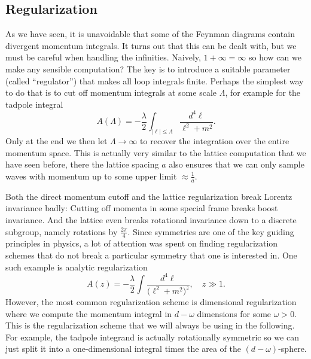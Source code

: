 \documentclass[12pt]{article}
\begin{document}
\subsection{Regularization}

As we have seen, it is unavoidable that some of the Feynman diagrams
contain divergent momentum integrals. It turns out that this can be
dealt with, but we must be careful when handling the
infinities. Naively, $1+\infty = \infty$ so how can we make any
sensible computation? The key is to introduce a suitable parameter
(called ``regulator'') that makes all loop integrals finite. Perhaps
the simplest way to do that is to cut off momentum integrals at some
scale $\Lambda$, for example for the tadpole integral
\begin{equation}
  A(\Lambda) = - \frac{\lambda}{2} \int_{|\ell| \leq \Lambda}
  \frac{d^4 \ell}{\ell^2+m^2}.
\end{equation}
Only at the end we then let $\Lambda \to \infty$ to recover the
integration over the entire momentum space. This is actually very
similar to the lattice computation that we have seen before, there the
lattice spacing $a$ also ensures that we can only sample waves with
momentum up to some upper limit $\approx \frac{1}{a}$.

Both the direct momentum cutoff and the lattice regularization break
Lorentz invariance badly: Cutting off momenta in some special frame
breaks boost invariance. And the lattice even breaks rotational
invariance down to a discrete subgroup, namely rotations by
$\tfrac{2\pi}{4}$. Since symmetries are one of the key guiding
principles in physics, a lot of attention was spent on finding
regularization schemes that do not break a particular symmetry that
one is interested in. One such example is analytic regularization
\begin{equation}
  A(z) = - \frac{\lambda}{2} \int
  \frac{d^4 \ell}{\big(\ell^2+m^2\big)^z},
  \quad
  z \gg 1.
\end{equation}
However, the most common regularization scheme is dimensional
regularization where we compute the momentum integral in $d-\omega$
dimensions for some $\omega > 0$. This is the regularization scheme
that we will always be using in the following. For example, the
tadpole integrand is actually rotationally symmetric so we can just
split it into a one-dimensional integral times the area of the
$(d-\omega)$-sphere.
\end{document}
